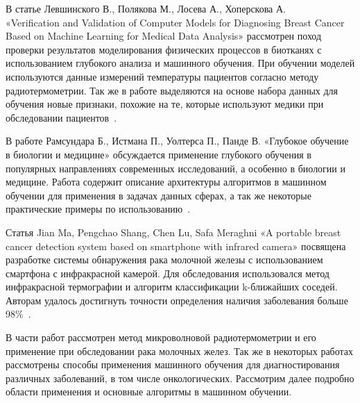 \par
В статье Левшинского В., Полякова М., Лосева А., Хоперскова А. \\ «Verification and Validation of Computer Models for Diagnosing Breast Cancer Based on Machine Learning for Medical Data Analysis» рассмотрен поход проверки результатов моделирования физических процессов в биотканях с использованием глубокого анализа и машинного обучения. При обучении моделей используются данные измерений температуры пациентов согласно методу радиотермометрии. Так же в работе выделяются на основе набора данных для обучения новые признаки, похожие на те, которые используют медики при обследовании пациентов~\cite{lev-polyakov-losev-hoperskov}.
\par
В работе Рамсундара Б., Истмана П., Уолтерса П., Панде В. «Глубокое обучение в биологии и медицине» обсуждается применение глубокого обучения в популярных направлениях современных исследований, а особенно в биологии и медицине. Работа содержит описание архитектуры алгоритмов в машинном обучении для применения в задачах данных сферах, а так же некоторые практические примеры по использованию~\cite{ramsundar-deep-learning}.
\par
Статья Jian Ma, Pengchao Shang, Chen Lu, Safa Meraghni «A portable breast cancer detection system based on smartphone with infrared camera» посвящена разработке системы обнаружения рака молочной железы с использованием смартфона с инфракрасной камерой. Для обследования использовался метод инфракрасной термографии и алгоритм классификации k-ближайших соседей. Авторам удалось достигнуть точности определения наличия заболевания больше 98\%~\cite{mobile-breast-cancer-detection}.
\par
В части работ рассмотрен метод микроволновой радиотермометрии и его применение при обследовании рака молочных желез. Так же в некоторых работах рассмотрены способы применения машинного обучения для диагностирования различных заболеваний, в том числе онкологических. Рассмотрим далее подробно области применения и основные алгоритмы в машинном обучении.

